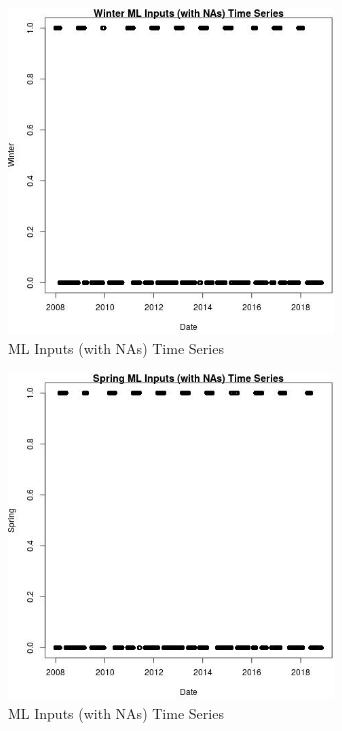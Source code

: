 \begin{figure} 
\centering  
\includegraphics[width=0.77\textwidth]{Code_Outputs/Report_ML_input_PM25_Step4_part_e_de_duplicated_aves_compiled_2019-05-20wNAs_WintervDate.jpg} 
\caption{\label{fig:Report_ML_input_PM25_Step4_part_e_de_duplicated_aves_compiled_2019-05-20wNAsWintervDate}ML Inputs (with NAs) Time Series} 
\end{figure} 
 

\begin{figure} 
\centering  
\includegraphics[width=0.77\textwidth]{Code_Outputs/Report_ML_input_PM25_Step4_part_e_de_duplicated_aves_compiled_2019-05-20wNAs_SpringvDate.jpg} 
\caption{\label{fig:Report_ML_input_PM25_Step4_part_e_de_duplicated_aves_compiled_2019-05-20wNAsSpringvDate}ML Inputs (with NAs) Time Series} 
\end{figure} 
 

